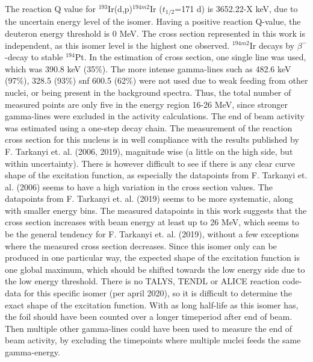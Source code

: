 \subsubsection{}
The reaction Q value for $^{193}$Ir(d,p)$^{194m2}$Ir ($t_{1/2}$=171 d) is 3652.22-X keV, due to the uncertain energy level of the isomer. Having a positive reaction Q-value, the deuteron energy threshold is 0 MeV. The cross section represented in this work is independent, as this isomer level is the highest one observed. $^{194m2}$Ir decays by $\beta^-$-decay to stable $^{194}$Pt. In the estimation of cross section, one single line was used, which was 390.8 keV (35\%). The more intense gamma-lines such as 482.6 keV (97\%), 328.5 (93\%) snf 600.5 (62\%)  were not used due to weak feeding from other nuclei, or being present in the background spectra. Thus, the total number of measured points are only five in the energy region 16-26 MeV, since stronger gamma-lines were excluded in the activity calculations. The end of beam activity was estimated using a one-step decay chain. The measurement of the reaction cross section for this nucleus is in well compliance with the results published by F. Tarkanyi et. al. (2006, 2019), magnitude wise (a little on the high side, but within uncertainty). There is however difficult to see if there is any clear curve shape of the excitation function, as especially the datapoints from F. Tarkanyi et. al. (2006) seems to have a high variation in the cross section values. The datapoints from F. Tarkanyi et. al. (2019) seems to be more systematic, along with smaller energy bins. The measured datapoints in this work suggests that the cross section increases with beam energy at least up to 26 MeV, which seems to be the general tendency for F. Tarkanyi et. al. (2019), without a few exceptions where the measured cross section decreases. Since this isomer only can be produced in one particular way, the expected shape of the excitation function is one global maximum, which should be shifted towards the low energy side due to the low energy threshold. There is no TALYS, TENDL or ALICE reaction code-data for this specific isomer (per april 2020), so it is difficult to determine the exact shape of the excitation function. With as long half-life as this isomer has, the foil should have been counted over a longer timeperiod after end of beam. Then multiple other gamma-lines could have been used to measure the end of beam activity, by excluding the timepoints where multiple nuclei feeds the same gamma-energy. 

